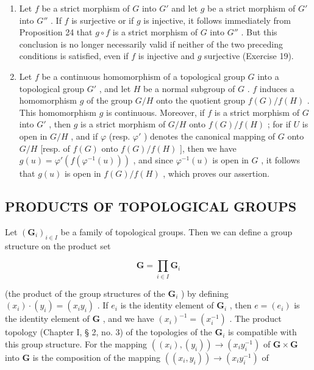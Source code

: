 \begin{enumerate}
\def\labelenumi{\arabic{enumi})}
\setcounter{enumi}{1}
\item
  Let \(f\) be a strict morphism of \(G\) into \(G'\) and let \(g\) be a strict morphism of \(G'\) into \(G''\) . If \(f\) is surjective or if \(g\) is injective, it follows immediately from Proposition 24 that \(g \circ f\) is a strict morphism of \(G\) into \(G''\) . But this conclusion is no longer necessarily valid if neither of the two preceding conditions is satisfied, even if \(f\) is injective and \(g\) surjective (Exercise 19).
\item
  Let \(f\) be a continuous homomorphism of a topological group \(G\) into a topological group \(G'\) , and let \(H\) be a normal subgroup of \(G\) . \(f\) induces a homomorphism \(g\) of the group \(G / H\) onto the quotient group \(f(G) / f(H)\) . This homomorphism \(g\) is continuous. Moreover, if \(f\) is a strict morphism of \(G\) into \(G'\) , then \(g\) is a strict morphism of \(G / H\) onto \(f(G) / f(H)\) ; for if \(U\) is open in \(G / H\) , and if \(\varphi\) (resp. \(\varphi'\) ) denotes the canonical mapping of \(G\) onto \(G / H\) {[}resp. of \(f(G)\) onto \(f(G) / f(H)\) {]}, then we have \(g(u) = \varphi'(f(\varphi^{-1}(u)))\) , and since \(\varphi^{-1}(u)\) is open in \(G\) , it follows that \(g(u)\) is open in \(f(G) / f(H)\) , which proves our assertion.
\end{enumerate}

\subsection{PRODUCTS OF TOPOLOGICAL GROUPS}

Let \((\mathbf{G}_i)_{i\in I}\) be a family of topological groups. Then we can define a group structure on the product set

\[
\mathbf {G} = \prod_ {i \in I} \mathbf {G} _ {i}
\]

(the product of the group structures of the \(\mathbf{G}_i\) ) by defining \((x_i) \cdot (y_i) = (x_i y_i)\) . If \(e_i\) is the identity element of \(\mathbf{G}_i\) , then \(e = (e_i)\) is the identity element of \(\mathbf{G}\) , and we have \((x_i)^{-1} = (x_i^{-1})\) . The product topology (Chapter I, § 2, no. 3) of the topologies of the \(\mathbf{G}_i\) is compatible with this group structure. For the mapping \(((x_i), (y_i)) \to (x_i y_i^{-1})\) of \(\mathbf{G} \times \mathbf{G}\) into \(\mathbf{G}\) is the composition of the mapping \(((x_i, y_i)) \to (x_i y_i^{-1})\) of

